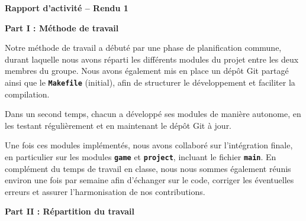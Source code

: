 \documentclass[10pt,a4paper]{article}
\begin{document}
\begin{center}
    {\huge \textbf{Rapport d'activit\'e -- Rendu 1}}
\end{center}
\vspace{0.5cm}
{\large \textbf{Part I : Méthode de travail}}

\begin{list}{}{\leftmargin=0.5cm \rightmargin=0cm}
\item
Notre méthode de travail a débuté par une phase de planification
commune, durant laquelle nous avons réparti les différents modules
du projet entre les deux membres du groupe. Nous avons également mis
en place un dépôt Git partagé ainsi que le \textbf{\texttt{Makefile}} (initial), afin
de structurer le développement et faciliter la compilation.

Dans un second temps, chacun a développé ses modules de manière
autonome, en les testant régulièrement et en maintenant le dépôt Git
à jour.

Une fois ces modules implémentés, nous avons collaboré sur
l’intégration finale, en particulier sur les modules \textbf{\texttt{game}}
et \textbf{\texttt{project}}, incluant le fichier \textbf{\texttt{main}}. En complément
du temps de travail en classe, nous nous sommes également réunis
environ une fois par semaine afin d’échanger sur le code, corriger
les éventuelles erreurs et assurer l’harmonisation de nos
contributions.


\end{list}

{\large \textbf{Part II : Répartition du travail}}
\end{document}
